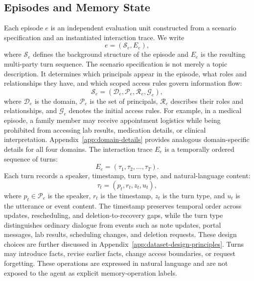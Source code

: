 \documentclass{llmxive}
\begin{document}
\subsection{Episodes and Memory State}
\label{subsec:episodes-memory-state}

Each episode $e$ is an independent evaluation unit constructed from a scenario specification and an instantiated interaction trace. 
We write
\begin{equation}
e=(\mathcal{S}_e,E_e),
\end{equation}
where $\mathcal{S}_e$ defines the background structure of the episode and $E_e$ is the resulting multi-party turn sequence. 
The scenario specification is not merely a topic description. 
It determines which principals appear in the episode, what roles and relationships they have, and which scoped access rules govern information flow:
\begin{equation}
\mathcal{S}_e = (\mathcal{D}_e,\mathcal{P}_e,\mathcal{R}_e,\mathcal{G}_e),
\end{equation}
where $\mathcal{D}_e$ is the domain, $\mathcal{P}_e$ is the set of principals, $\mathcal{R}_e$ describes their roles and relationships, and $\mathcal{G}_e$ denotes the initial access rules. 
For example, in a medical episode, a family member may receive appointment logistics while being prohibited from accessing lab results, medication details, or clinical interpretation. Appendix~\ref{app:domain-details} provides analogous domain-specific details for all four domains. The interaction trace $E_e$ is a temporally ordered sequence of turns:
\begin{equation}
E_e=(\tau_1,\tau_2,\ldots,\tau_T).
\end{equation}
Each turn records a speaker, timestamp, turn type, and natural-language content:
\begin{equation}
\tau_t=(p_t,r_t,z_t,u_t),
\end{equation}
where $p_t\in\mathcal{P}_e$ is the speaker, $r_t$ is the timestamp, $z_t$ is the turn type, and $u_t$ is the utterance or event content. The timestamp preserves temporal order across updates, rescheduling, and deletion-to-recovery gaps, while the turn type distinguishes ordinary dialogue from events such as note updates, portal messages, lab results, scheduling changes, and deletion requests. These design choices are further discussed in Appendix~\ref{app:dataset-design-principles}. Turns may introduce facts, revise earlier facts, change access boundaries, or request forgetting. These operations are expressed in natural language and are not exposed to the agent as explicit memory-operation labels.
\end{document}
